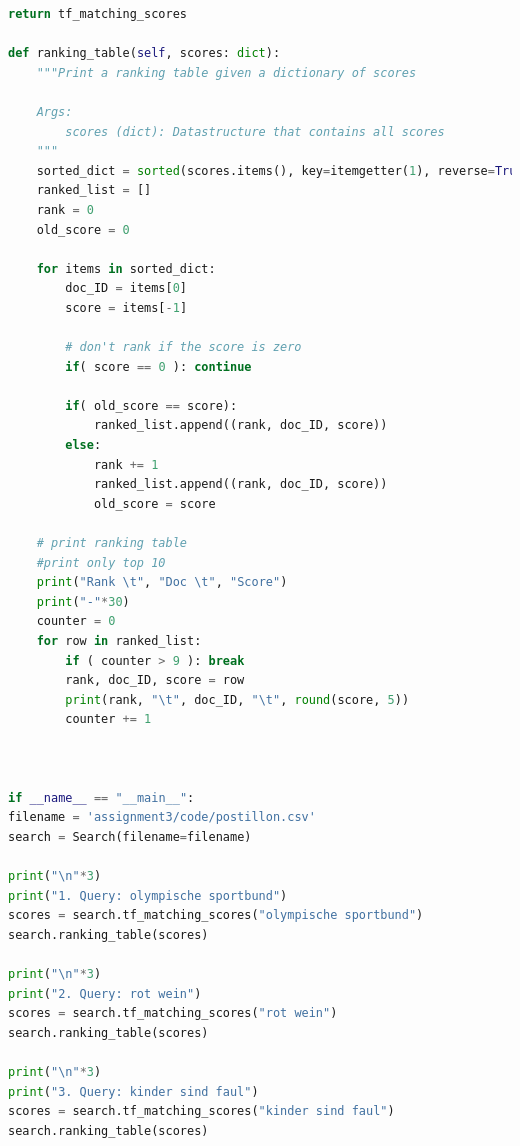 \documentclass[a4paper]{scrartcl}
\begin{document}
\begin{lstlisting}[language=python]
    return tf_matching_scores

def ranking_table(self, scores: dict):
    """Print a ranking table given a dictionary of scores

    Args:
        scores (dict): Datastructure that contains all scores
    """
    sorted_dict = sorted(scores.items(), key=itemgetter(1), reverse=True)
    ranked_list = []
    rank = 0
    old_score = 0
    
    for items in sorted_dict:
        doc_ID = items[0]
        score = items[-1]

        # don't rank if the score is zero
        if( score == 0 ): continue
        
        if( old_score == score):
            ranked_list.append((rank, doc_ID, score))
        else:
            rank += 1
            ranked_list.append((rank, doc_ID, score))
            old_score = score
    
    # print ranking table
    #print only top 10
    print("Rank \t", "Doc \t", "Score")
    print("-"*30)
    counter = 0
    for row in ranked_list:
        if ( counter > 9 ): break
        rank, doc_ID, score = row
        print(rank, "\t", doc_ID, "\t", round(score, 5))
        counter += 1
    


if __name__ == "__main__":
filename = 'assignment3/code/postillon.csv'
search = Search(filename=filename)

print("\n"*3)
print("1. Query: olympische sportbund")
scores = search.tf_matching_scores("olympische sportbund")
search.ranking_table(scores)

print("\n"*3)
print("2. Query: rot wein")
scores = search.tf_matching_scores("rot wein")
search.ranking_table(scores)

print("\n"*3)
print("3. Query: kinder sind faul")
scores = search.tf_matching_scores("kinder sind faul")
search.ranking_table(scores)

\end{lstlisting}
\end{document}

